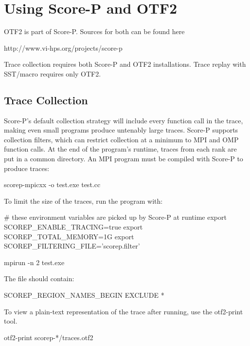 
\section{Using Score-P and OTF2}
\label{sec:tutorial:otf}

OTF2 is part of Score-P. Sources for both can be found here 
\begin{ViFile}
http://www.vi-hps.org/projects/score-p
\end{ViFile}


Trace collection requires both Score-P and OTF2 installations. Trace replay with SST/macro requires only OTF2.


\subsection{Trace Collection}
\label{subsec:otf:traceCollection}
Score-P's default collection strategy will include every function call in the trace, making even small programs produce untenably large traces. Score-P supports collection filters, which can restrict collection at a minimum to MPI and OMP function calls. At the end of the program's runtime, traces from each rank are put in a common directory.  An MPI program must be compiled with Score-P to produce traces:

\begin{ShellCmd}
scorep-mpicxx -o test.exe test.cc
\end{ShellCmd}



To limit the size of the traces, run the program with:

\begin{ViFile}
# these environment variables are picked up by Score-P at runtime
export SCOREP_ENABLE_TRACING=true
export SCOREP_TOTAL_MEMORY=1G
export SCOREP_FILTERING_FILE='scorep.filter'

mpirun -n 2 test.exe
\end{ViFile}

The file  should contain:
\begin{ViFile}
SCOREP_REGION_NAMES_BEGIN EXCLUDE *
\end{ViFile}


To view a plain-text representation of the trace after running, use the otf2-print tool.

\begin{ViFile}
otf2-print scorep-*/traces.otf2
\end{ViFile}

